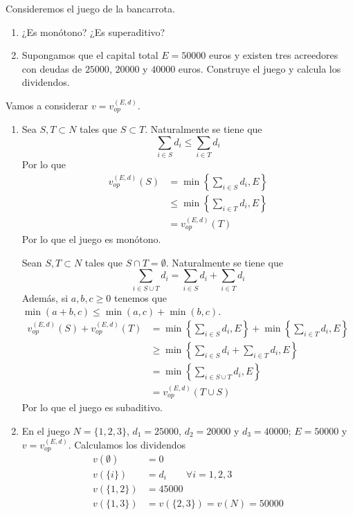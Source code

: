 \documentclass[twoside]{article}
\begin{document}
\begin{ejercicio}{2}Consideremos el juego de la bancarrota.
\begin{enumerate}
\item ¿Es monótono? ¿Es superaditivo?
\item Supongamos que el capital total $E=50000$ euros y existen tres acreedores con deudas de $25000$, $20000$ y $40000$ euros. Construye el juego y calcula los dividendos.
\end{enumerate} 
\end{ejercicio}
\begin{solucion}
Vamos a considerar $v = v^{(E,d)}_{op}$.
\begin{enumerate}
\item Sea $S,T \subset N$ tales que $S\subset T$. Naturalmente se tiene que
$$\sum_{i \in S} d_i \leq \sum_{i \in T} d_i$$
Por lo que
\begin{align*}
v^{(E,d)}_{op}(S) &= \min\left\{\sum_{i\in S} d_i,E\right\}\\
&\leq \min\left\{\sum_{i\in T} d_i,E\right\} \\
&= v^{(E,d)}_{op}(T)
\end{align*}
Por lo que el juego es monótono.

Sean $S,T\subset N$ tales que $S\cap T = \emptyset$. Naturalmente se tiene que
$$
\sum_{i \in S\cup T} d_i = \sum_{i \in S} d_i + \sum_{i \in T} d_i
$$
Además, si $a,b,c\geq 0$ tenemos que $\min(a+b,c) \leq \min(a,c)+\min(b,c)$.  
\begin{align*}
v^{(E,d)}_{op}(S) + v^{(E,d)}_{op}(T) &= \min\left\{\sum_{i\in S} d_i,E\right\} + \min\left\{\sum_{i\in T} d_i,E\right\}\\
&\geq \min\left\{\sum_{i\in S} d_i + \sum_{i\in T} d_i,E\right\}\\
&= \min\left\{\sum_{i\in S\cup T} d_i,E\right\} \\
&= v^{(E,d)}_{op}(T\cup S)
\end{align*}
Por lo que el juego es subaditivo.
\item En el juego $N=\{1,2,3\}$, $d_1 = 25000$, $d_2 = 20000$ y $d_3 = 40000$; $E=50000$ y $v=v^{(E,d)}_{op}$. Calculamos los dividendos
\begin{align*}
v(\emptyset) &= 0\\
v(\{i\})& = d_i  \qquad \forall i = 1,2,3\\
v(\{1,2\}) &= 45000 \\ 
v(\{1,3\}) &= v(\{2,3\}) = v(N) = 50000
\end{align*}
\end{enumerate}
\end{solucion}
\newpage
\end{document}
